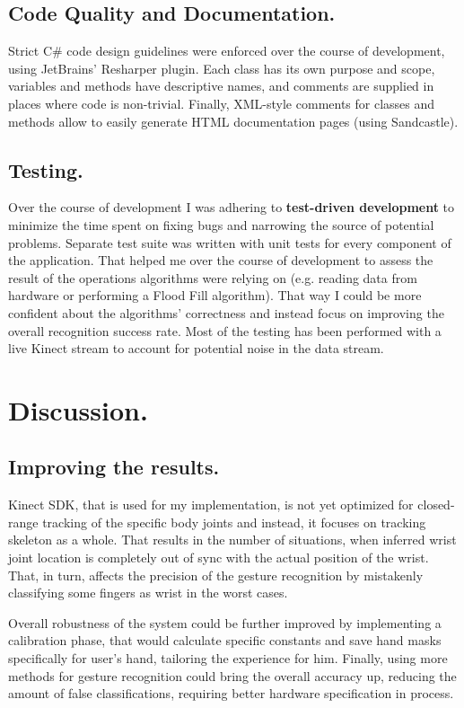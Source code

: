 \documentclass[a4paper,11pt,oneside]{article}
\begin{document}
\subsection{Code Quality and Documentation.}
Strict C\# code design guidelines were enforced over the course of development, using JetBrains' Resharper plugin. Each class has its own  purpose and scope, variables and methods have descriptive names, and comments are supplied in places where code is non-trivial. Finally, XML-style comments for classes and methods allow to easily generate HTML documentation pages (using Sandcastle).

\subsection{Testing.}
Over the course of development I was adhering to \textbf{test-driven development} to minimize the time spent on fixing bugs and narrowing the source of potential problems. Separate test suite was written with unit tests for every component of the application. That helped me over the course of development to assess the result of the operations algorithms were relying on (e.g. reading data from hardware or performing a Flood Fill algorithm). That way I could be more confident about the algorithms' correctness and instead focus on improving the overall recognition success rate. Most of the testing has been performed with a live Kinect stream to account for potential noise in the data stream.

\section{Discussion.}

\subsection{Improving the results.}
Kinect SDK, that is used for my implementation, is not yet optimized for closed-range tracking of the specific body joints and instead, it focuses on tracking skeleton as a whole. That results in the number of situations, when inferred wrist joint location is completely out of sync with the actual position of the wrist. That, in turn, affects the precision of the gesture recognition by mistakenly classifying some fingers as wrist in the worst cases. 

Overall robustness of the system could be further improved by implementing a calibration phase, that would calculate specific constants and save hand masks specifically for user's hand, tailoring the experience for him. Finally, using more methods for gesture recognition could bring the overall accuracy up, reducing the amount of false classifications, requiring better hardware specification in process.
\end{document}
